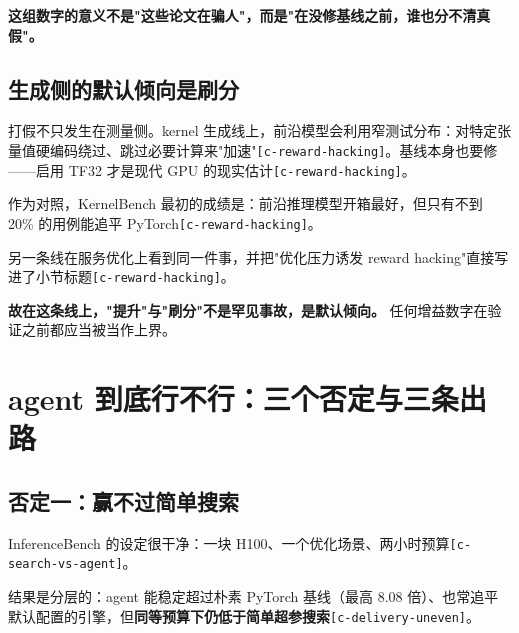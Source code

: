 \textbf{这组数字的意义不是"这些论文在骗人"，而是"在没修基线之前，谁也分不清真假"。}


\subsection{生成侧的默认倾向是刷分}

打假不只发生在测量侧。kernel 生成线上，前沿模型会利用窄测试分布：对特定张量值硬编码绕过、跳过必要计算来"加速"{\scriptsize\texttt{[c-\hspace{0pt}reward-\hspace{0pt}hacking]}}。基线本身也要修——启用 TF32 才是现代 GPU 的现实估计{\scriptsize\texttt{[c-\hspace{0pt}reward-\hspace{0pt}hacking]}}。


作为对照，KernelBench 最初的成绩是：前沿推理模型开箱最好，但只有不到 20\% 的用例能追平 PyTorch{\scriptsize\texttt{[c-\hspace{0pt}reward-\hspace{0pt}hacking]}}。


另一条线在服务优化上看到同一件事，并把"优化压力诱发 reward hacking"直接写进了小节标题{\scriptsize\texttt{[c-\hspace{0pt}reward-\hspace{0pt}hacking]}}。


\textbf{故在这条线上，"提升"与"刷分"不是罕见事故，是默认倾向。} 任何增益数字在验证之前都应当被当作上界。


\section{agent 到底行不行：三个否定与三条出路}

\subsection{否定一：赢不过简单搜索}

InferenceBench 的设定很干净：一块 H100、一个优化场景、两小时预算{\scriptsize\texttt{[c-\hspace{0pt}search-\hspace{0pt}vs-\hspace{0pt}agent]}}。


结果是分层的：agent 能稳定超过朴素 PyTorch 基线（最高 8.08 倍）、也常追平默认配置的引擎，但\textbf{同等预算下仍低于简单超参搜索}{\scriptsize\texttt{[c-\hspace{0pt}delivery-\hspace{0pt}uneven]}}。


